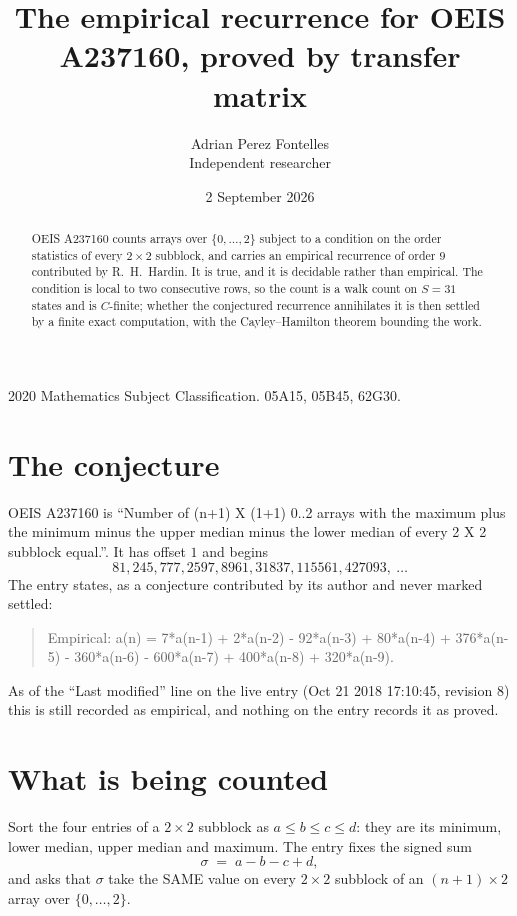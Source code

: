 \documentclass[11pt,a4paper]{article}
\title{The empirical recurrence for OEIS A237160, proved by transfer matrix}
\author{Adrian Perez Fontelles\\ \small Independent researcher}
\date{2 September 2026}
\theoremstyle{plain}
\theoremstyle{definition}
\begin{document}
\maketitle

\begin{abstract}
OEIS A237160 counts arrays over $\{0,\dots,2\}$ subject to a condition on the order
statistics of every $2\times2$ subblock, and carries an empirical recurrence of order
$9$ contributed by R.~H.~Hardin. It is true, and it is decidable rather than empirical.
The condition is local to two consecutive rows, so the count is a walk count on $S=31$
states and is $C$-finite; whether the conjectured recurrence annihilates it is then settled by
a finite exact computation, with the Cayley--Hamilton theorem bounding the work.
\end{abstract}

\noindent\small 2020 Mathematics Subject Classification. 05A15, 05B45, 62G30.\normalsize

\section{The conjecture}

OEIS A237160 is ``Number of (n+1) X (1+1) 0..2 arrays with the maximum plus the minimum minus the upper median minus the lower median of every 2 X 2 subblock equal.''. It has offset $1$ and begins
\[
81, 245, 777, 2597, 8961, 31837, 115561, 427093,\ \dots
\]
The entry states, as a conjecture contributed by its author and never marked settled:
\begin{quote}
Empirical: a(n) = 7*a(n-1) + 2*a(n-2) - 92*a(n-3) + 80*a(n-4) + 376*a(n-5) - 360*a(n-6) - 600*a(n-7) + 400*a(n-8) + 320*a(n-9).
\end{quote}
As of the ``Last modified'' line on the live entry (Oct 21 2018 17:10:45, revision 8) this is still
recorded as empirical, and nothing on the entry records it as proved.

\section{What is being counted}

Sort the four entries of a $2\times2$ subblock as $a\le b\le c\le d$: they
are its minimum, lower median, upper median and maximum. The entry fixes the signed sum
\[
\sigma\;=\;a-b-c+d,
\]
and asks that $\sigma$ take the SAME value on every $2\times2$ subblock of an
$(n+1)\times2$ array over $\{0,\dots,2\}$.
\end{document}
